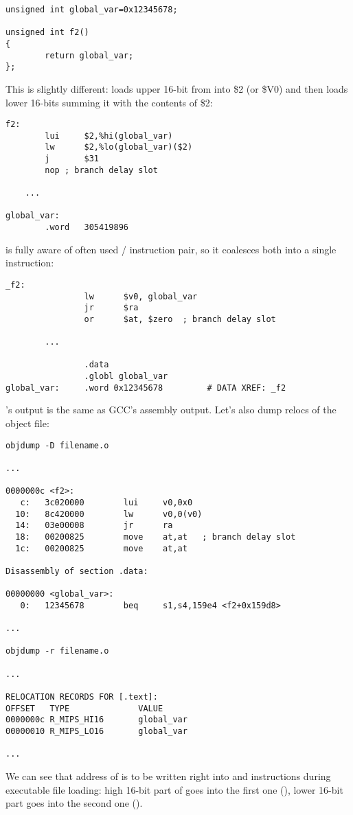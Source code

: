 \begin{lstlisting}[style=customc]
unsigned int global_var=0x12345678;

unsigned int f2()
{
        return global_var;
};
\end{lstlisting}


This is slightly different:  loads upper 16-bit from  into \$2 (or \$V0) and then  loads lower 16-bits summing it with the contents of \$2:

\begin{lstlisting}[caption=GCC 4.4.5 -O3 (\assemblyOutput),style=customasmMIPS]
f2:
        lui     $2,%hi(global_var)
        lw      $2,%lo(global_var)($2)
        j       $31
        nop	; branch delay slot

	...

global_var:
        .word   305419896
\end{lstlisting}

\IDA is fully aware of often used / instruction pair, so it coalesces both into a single  instruction:

\begin{lstlisting}[caption=GCC 4.4.5 -O3 (IDA),style=customasmMIPS]
_f2:
                lw      $v0, global_var
                jr      $ra
                or      $at, $zero	; branch delay slot

		...

                .data
                .globl global_var
global_var:     .word 0x12345678         # DATA XREF: _f2
\end{lstlisting}

's output is the same as GCC's assembly output.
Let's also dump relocs of the object file:

\begin{lstlisting}[caption=objdump,style=customasmMIPS]
objdump -D filename.o

...

0000000c <f2>:
   c:   3c020000        lui     v0,0x0
  10:   8c420000        lw      v0,0(v0)
  14:   03e00008        jr      ra
  18:   00200825        move    at,at	; branch delay slot
  1c:   00200825        move    at,at

Disassembly of section .data:

00000000 <global_var>:
   0:   12345678        beq     s1,s4,159e4 <f2+0x159d8>

...

objdump -r filename.o

...

RELOCATION RECORDS FOR [.text]:
OFFSET   TYPE              VALUE
0000000c R_MIPS_HI16       global_var
00000010 R_MIPS_LO16       global_var

...

\end{lstlisting}

We can see that address of  is to be written right into  and  instructions during executable file loading:
high 16-bit part of  goes into the first one (), lower 16-bit part goes into the second one ().

